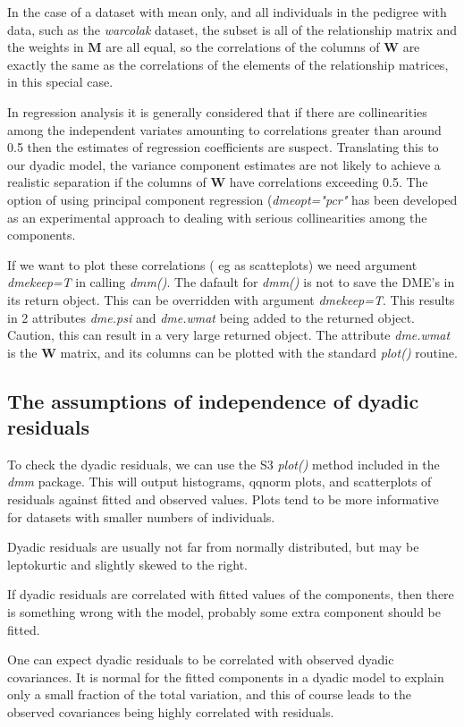 \documentclass[titlepage]{article}  %
\begin{document}
In the case of a dataset with mean only, and all individuals in the pedigree with data, such as the {\em warcolak} dataset, the subset is all of the relationship matrix and the weights in $\bm{M}$ are all equal, so the correlations of the columns of $\bm{W}$ are exactly the same as the correlations of the elements of the relationship matrices, in this special case.

In regression analysis it is generally considered that if there are collinearities among the independent variates amounting to correlations greater than around 0.5 then the estimates of regression coefficients are suspect. Translating this to our dyadic model, the variance component estimates are not likely to achieve a realistic separation if the columns of $\bm{W}$ have correlations exceeding 0.5. The option of using principal component regression ({\em dmeopt="pcr"} has been developed as an experimental approach to dealing with serious collinearities among the components.

If we want to plot these correlations ( eg as scatteplots) we need argument {\em dmekeep=T} in calling {\em dmm()}. The dafault for {\em dmm()} is not to save the DME's in its return object. This can be overridden with argument {\em dmekeep=T}. This results in 2 attributes {\em dme.psi} and {\em dme.wmat} being added to the returned object. Caution, this can result in a very large returned object. The attribute {\em dme.wmat} is the $\bm{W}$ matrix, and its columns can be plotted with the standard {\em plot()} routine.

\subsection{The assumptions of independence of dyadic residuals}
To check the dyadic residuals, we can use the S3 {\em plot()} method included in the {\em dmm} package. This will output histograms, qqnorm plots, and scatterplots of residuals against fitted and observed values. Plots tend to be more informative for datasets with smaller numbers of individuals.

Dyadic residuals are usually not far from normally distributed, but may be leptokurtic and slightly skewed to the right.

If dyadic residuals are correlated with fitted values of the components, then there is something wrong with the model, probably some extra component should be fitted. 

One can expect dyadic residuals to be correlated with observed dyadic covariances. It is normal for the fitted components in a dyadic model to explain only a small fraction of the total variation, and this of course leads to the observed covariances being highly correlated with residuals.
\end{document}
